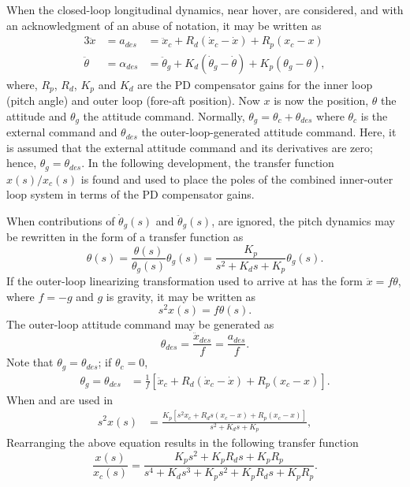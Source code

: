 When the closed-loop longitudinal dynamics, near hover, are
considered, and with an acknowledgment of an abuse of notation, it
may be written as
\begin{alignat}{3}
\label{eq:xdd}
\ddot{x} &= a_{des} &=
\ddot{x}_c + R_d(\dot{x}_c - \dot{x}) +
R_p(x_c - x)\\
\label{eq:thdd} \ddot{\theta} &= \alpha_{des} &= \ddot{\theta}_g +
K_d(\dot{\theta}_g - \dot{\theta}) + K_p(\theta_g - \theta),
\end{alignat}
where, $R_p$, $R_d$, $K_p$ and $K_d$ are the PD compensator gains
for the inner loop (pitch angle) and outer loop (fore-aft position).
Now $x$ is now the position, $\theta$ the attitude and $\theta_g$
the attitude command. Normally, $\theta_g = \theta_c + \theta_{des}$
where $\theta_c$ is the external command and $\theta_{des}$ the
outer-loop-generated attitude command. Here, it is assumed that the
external attitude command and its derivatives are zero; hence,
$\theta_g = \theta_{des}$. In the following development, the
transfer function $x(s)/x_c(s)$ is found and used to place the poles
of the combined inner-outer loop system in terms of the PD
compensator gains.

When contributions of $\dot{\theta}_g(s)$ and $\ddot{\theta}_g(s)$,
are ignored, the pitch dynamics  may be rewritten in the
form of a transfer function as
\begin{equation}
\label{eq:thtf} \theta(s) =
\frac{\theta(s)}{\theta_g(s)}\theta_g(s) = \frac{K_p}{s^2 + K_ds +
K_p}\theta_g(s).
\end{equation}
%
If the outer-loop linearizing transformation used to arrive at
 has the form $\ddot{x} = f\theta$, where $f = -g$ and
$g$ is gravity, it may be written as
\begin{equation}
\label{eq:xtf} s^2x(s) = f\theta(s).
\end{equation}
The outer-loop attitude command may be generated as
\begin{equation}
\label{eq:thol} \theta_{des} = \frac{\ddot{x}_{des}}{f} =
\frac{a_{des}}{f}.
\end{equation}
Note that $\theta_{g} = \theta_{des}$; if $\theta_c = 0$,
\begin{align}
\label{eq:thetag} \theta_g = \theta_{des} &=
\frac{1}{f}\left[\ddot{x}_c + R_d(\dot{x}_c - \dot{x}) +
R_p(x_c-x) \right].
\end{align}
%
When  and  are used in 
\begin{equation}
\begin{split}
\label{eq:s2x}%
s^2x(s) &= \frac{K_p\left[s^2x_c + R_ds(x_c - x) + R_p(x_c - x)
\right]}{s^2 + K_ds + K_p},
\end{split}
\end{equation}
Rearranging the above equation results in the following transfer function
\begin{equation}
\label{eq:xxctf}
\frac{x(s)}{x_c(s)} =
\frac{K_ps^2 + K_pR_ds + K_pR_p}
{s^4 + K_ds^3 + K_ps^2 + K_pR_ds + K_pR_p}.
\end{equation}

